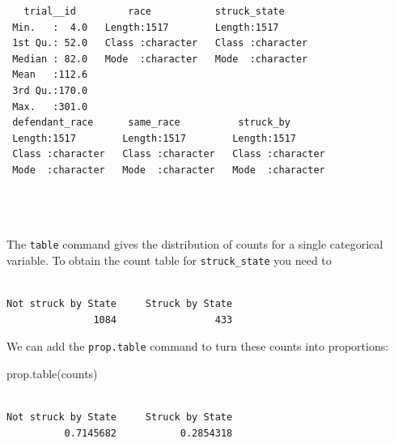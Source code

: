 \documentclass[
]{book}
\newenvironment{Shaded}{\begin{snugshade}}{\end{snugshade}}
\newcommand{\FunctionTok}[1]{\textcolor[rgb]{0.00,0.00,0.00}{#1}}
\newcommand{\NormalTok}[1]{#1}
\newcommand{\OtherTok}[1]{\textcolor[rgb]{0.56,0.35,0.01}{#1}}
\newcommand{\SpecialCharTok}[1]{\textcolor[rgb]{0.00,0.00,0.00}{#1}}
\begin{document}
\begin{verbatim}
   trial__id         race           struck_state      
 Min.   :  4.0   Length:1517        Length:1517       
 1st Qu.: 52.0   Class :character   Class :character  
 Median : 82.0   Mode  :character   Mode  :character  
 Mean   :112.6                                        
 3rd Qu.:170.0                                        
 Max.   :301.0                                        
 defendant_race      same_race          struck_by        
 Length:1517        Length:1517        Length:1517       
 Class :character   Class :character   Class :character  
 Mode  :character   Mode  :character   Mode  :character  
                                                         
                                                         
                                                         
\end{verbatim}

The \texttt{table} command gives the distribution of counts for a single categorical variable. To obtain the count table for \texttt{struck\_state} you need to

\begin{Shaded}
\end{Shaded}

\begin{verbatim}

Not struck by State     Struck by State 
               1084                 433 
\end{verbatim}

We can add the \texttt{prop.table} command to turn these counts into proportions:

\begin{Shaded}
\begin{Highlighting}[]
\FunctionTok{prop.table}\NormalTok{(counts)}
\end{Highlighting}
\end{Shaded}

\begin{verbatim}

Not struck by State     Struck by State 
          0.7145682           0.2854318 
\end{verbatim}
\end{document}
